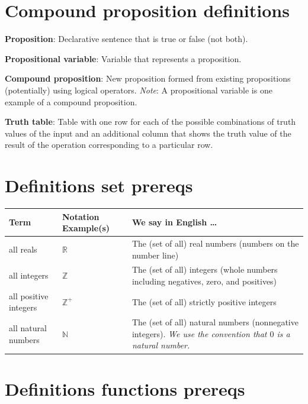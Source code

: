\documentclass[12pt, oneside]{article}
\begin{document}
\section*{Compound proposition definitions}


{\bf Proposition}: Declarative sentence that is true or false (not both).

{\bf Propositional variable}: Variable that represents a proposition.

{\bf Compound proposition}: New proposition formed from existing propositions (potentially) using logical operators.
{\it Note}: A propositional variable is one example of a compound proposition.

{\bf Truth table}: Table with one row for each of the possible combinations of truth values of the input and 
    an additional column that shows the truth value of the result of the operation corresponding to a particular row.
    
 \vfill
\section*{Definitions set prereqs}


\begin{center}
\begin{tabular}{|llp{9.8cm}|}
\hline
{\bf Term} & {\bf Notation Example(s)} & {\bf We say in English \ldots } \\
\hline
all reals & $\mathbb{R}$ & The (set of all) real numbers (numbers on the number line)\\
all integers & $\mathbb{Z}$ & The (set of all) integers (whole numbers including negatives, zero, and positives) \\
all positive integers & $\mathbb{Z}^+$ & The (set of all) strictly positive integers \\
all natural numbers & $\mathbb{N}$ & The (set of all) natural numbers (nonnegative integers). {\it We use the convention that $0$ is a natural number.} \\


\hline
\end{tabular}
\end{center} \vfill
\section*{Definitions functions prereqs}
\end{document}
